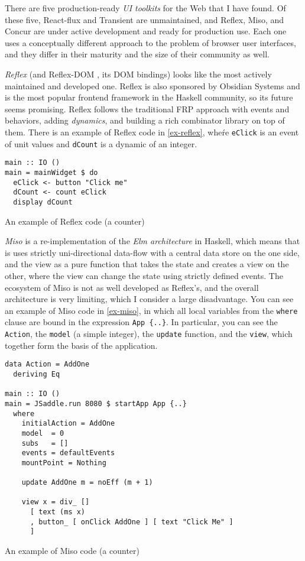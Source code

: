 \documentclass[english,odsaz]{fitthesis}
\begin{document}
There are five production-ready \emph{UI toolkits} for the Web that I have found. Of
these five, React-flux and Transient are unmaintained, and Reflex, Miso, and
Concur are under active development and ready for production use. Each one uses
a conceptually different approach to the problem of browser user interfaces, and
they differ in their maturity and the size of their community as well.

\emph{Reflex} \cite{reflex} (and Reflex-DOM \cite{reflex-dom}, its DOM bindings) looks like
the most actively maintained and developed one. Reflex is also sponsored by
Obsidian Systems \cite{obsidian} and is the most popular frontend framework in the
Haskell community, so its future seems promising. Reflex follows the traditional
FRP approach with events and behaviors, adding \emph{dynamics}, and building a rich
combinator library on top of them. There is an example of Reflex code in
\ref{ex-reflex}, wheŕe \texttt{eClick} is an event of unit values and \texttt{dCount} is a dynamic
of an integer.

\begin{listing}[htbp]
\begin{verbatim}
main :: IO ()
main = mainWidget $ do
  eClick <- button "Click me"
  dCount <- count eClick
  display dCount
\end{verbatim}
\caption{An example of Reflex code (a counter) \label{ex-reflex}}
\end{listing}

\emph{Miso} \cite{miso} is a re-implementation of the \emph{Elm architecture} in Haskell, which
means that is uses strictly uni-directional data-flow with a central data store
on the one side, and the view as a pure function that takes the state and
creates a view on the other, where the view can change the state using strictly
defined events. The ecosystem of Miso is not as well developed as Reflex's, and
the overall architecture is very limiting, which I consider a large
disadvantage. You can see an example of Miso code in \ref{ex-miso}, in which all
local variables from the \texttt{where} clause are bound in the expression \texttt{App \{..\}}. In
particular, you can see the \texttt{Action}, the \texttt{model} (a simple integer), the \texttt{update}
function, and the \texttt{view}, which together form the basis of the application.

\begin{listing}[htbp]
\begin{verbatim}
data Action = AddOne
  deriving Eq

main :: IO ()
main = JSaddle.run 8080 $ startApp App {..}
  where
    initialAction = AddOne
    model  = 0
    subs   = []
    events = defaultEvents
    mountPoint = Nothing

    update AddOne m = noEff (m + 1)

    view x = div_ []
      [ text (ms x)
      , button_ [ onClick AddOne ] [ text "Click Me" ]
      ]
\end{verbatim}
\caption{An example of Miso code (a counter) \label{ex-miso}}
\end{listing}
\end{document}
